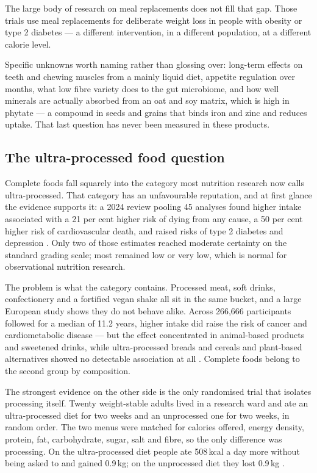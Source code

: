\documentclass[11pt,a4paper]{article}
\begin{document}
The large body of research on meal replacements does not fill that gap. Those trials
use meal replacements for deliberate weight loss in people with obesity or type 2
diabetes — a different intervention, in a different population, at a different calorie
level.

Specific unknowns worth naming rather than glossing over: long-term effects on teeth
and chewing muscles from a mainly liquid diet, appetite regulation over months, what
low fibre variety does to the gut microbiome, and how well minerals are actually
absorbed from an oat and soy matrix, which is high in phytate — a compound in seeds and
grains that binds iron and zinc and reduces uptake. That last question has never been
measured in these products.

\subsection{The ultra-processed food question}

Complete foods fall squarely into the category most nutrition research now calls
ultra-processed. That category has an unfavourable reputation, and at first glance the
evidence supports it: a 2024 review pooling 45 analyses found higher intake associated
with a 21 per cent higher risk of dying from any cause, a 50 per cent higher risk of
cardiovascular death, and raised risks of type 2 diabetes and depression
\cite{bmj-upf}. Only two of those estimates reached moderate certainty on the standard
grading scale; most remained low or very low, which is normal for observational
nutrition research.

The problem is what the category contains. Processed meat, soft drinks, confectionery
and a fortified vegan shake all sit in the same bucket, and a large European study
shows they do not behave alike. Across 266,666 participants followed for a median of
11.2 years, higher intake did raise the risk of cancer and cardiometabolic disease —
but the effect concentrated in animal-based products and sweetened drinks, while
ultra-processed breads and cereals and plant-based alternatives showed no detectable
association at all \cite{epic-upf}. Complete foods belong to the second group by
composition.

The strongest evidence on the other side is the only randomised trial that isolates
processing itself. Twenty weight-stable adults lived in a research ward and ate an
ultra-processed diet for two weeks and an unprocessed one for two weeks, in random
order. The two menus were matched for calories offered, energy density, protein, fat,
carbohydrate, sugar, salt and fibre, so the only difference was processing. On the
ultra-processed diet people ate 508\,kcal a day more without being asked to and gained
0.9\,kg; on the unprocessed diet they lost 0.9\,kg \cite{hall}.
\end{document}
